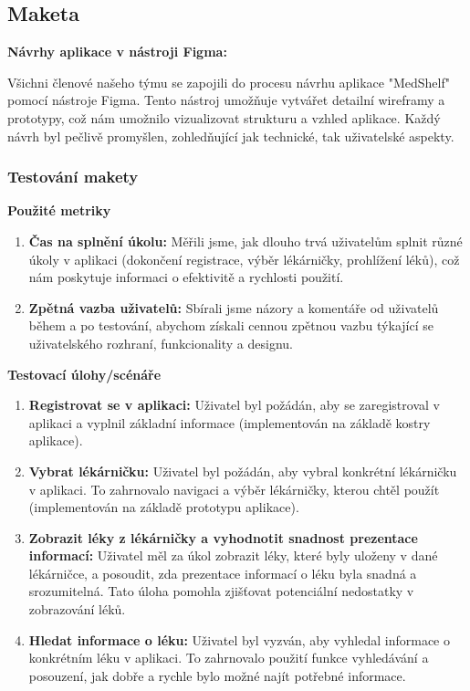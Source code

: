 \documentclass[a4paper, 11pt]{article}
\begin{document}
	\subsection{Maketa}
  \textbf {Návrhy aplikace v nástroji Figma:}

Všichni členové našeho týmu se zapojili do procesu návrhu aplikace "MedShelf" pomocí nástroje Figma. Tento nástroj umožňuje vytvářet detailní wireframy a prototypy, což nám umožnilo vizualizovat strukturu a vzhled aplikace. Každý návrh byl pečlivě promyšlen, zohledňující jak technické, tak uživatelské aspekty.


	\subsubsection{Testování makety}
\textbf{Použité metriky}
\begin{enumerate}
    \item \textbf{Čas na splnění úkolu:} Měřili jsme, jak dlouho trvá uživatelům splnit různé úkoly v aplikaci (dokončení registrace, výběr lékárničky, prohlížení léků), což nám poskytuje informaci o efektivitě a rychlosti použití.
    \item \textbf{Zpětná vazba uživatelů:} Sbírali jsme názory a komentáře od uživatelů během a po testování, abychom získali cennou zpětnou vazbu týkající se uživatelského rozhraní, funkcionality a designu.
\end{enumerate}

\textbf{Testovací úlohy/scénáře}
\begin{enumerate}
    \item \textbf{Registrovat se v aplikaci:} Uživatel byl požádán, aby se zaregistroval v aplikaci a vyplnil základní informace (implementován na základě kostry aplikace).
    \item \textbf{Vybrat lékárničku:} Uživatel byl požádán, aby vybral konkrétní lékárničku v aplikaci. To zahrnovalo navigaci a výběr lékárničky, kterou chtěl použít (implementován na základě prototypu aplikace).
    \item \textbf{Zobrazit léky z lékárničky a vyhodnotit snadnost prezentace informací:} Uživatel měl za úkol zobrazit léky, které byly uloženy v dané lékárničce, a posoudit, zda prezentace informací o léku byla snadná a srozumitelná. Tato úloha pomohla zjišťovat potenciální nedostatky v zobrazování léků.
    \item \textbf{Hledat informace o léku:} Uživatel byl vyzván, aby vyhledal informace o konkrétním léku v aplikaci. To zahrnovalo použití funkce vyhledávání a posouzení, jak dobře a rychle bylo možné najít potřebné informace.

\end{enumerate}
\end{document}

